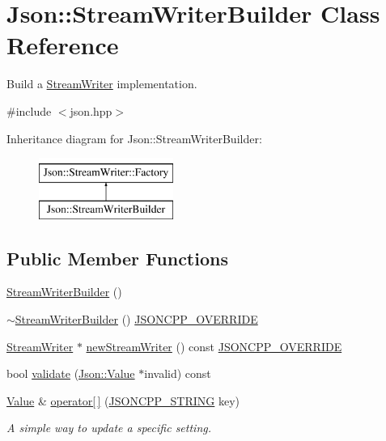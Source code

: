\hypertarget{classJson_1_1StreamWriterBuilder}{}\section{Json\+:\+:Stream\+Writer\+Builder Class Reference}
\label{classJson_1_1StreamWriterBuilder}


Build a \hyperlink{classJson_1_1StreamWriter}{Stream\+Writer} implementation.  




{\ttfamily \#include $<$json.\+hpp$>$}

Inheritance diagram for Json\+:\+:Stream\+Writer\+Builder\+:\begin{figure}[H]
\begin{center}
\leavevmode
\includegraphics[height=2.000000cm]{classJson_1_1StreamWriterBuilder}
\end{center}
\end{figure}
\subsection*{Public Member Functions}
\begin{DoxyCompactItemize}
\item 
\hyperlink{classJson_1_1StreamWriterBuilder_ab95b76179c152673ad14abc639a46ee4}{Stream\+Writer\+Builder} ()
\item 
\hyperlink{classJson_1_1StreamWriterBuilder_a93263f8ef1e2d22593907075d8f0aaef}{$\sim$\+Stream\+Writer\+Builder} () \hyperlink{json_8hpp_a824d6199c91488107e443226fa6022c5}{J\+S\+O\+N\+C\+P\+P\+\_\+\+O\+V\+E\+R\+R\+I\+DE}
\item 
\hyperlink{classJson_1_1StreamWriter}{Stream\+Writer} $\ast$ \hyperlink{classJson_1_1StreamWriterBuilder_ab9ee278609f88ae04a7c1a84e1f559e6}{new\+Stream\+Writer} () const \hyperlink{json_8hpp_a824d6199c91488107e443226fa6022c5}{J\+S\+O\+N\+C\+P\+P\+\_\+\+O\+V\+E\+R\+R\+I\+DE}
\item 
bool \hyperlink{classJson_1_1StreamWriterBuilder_aa1dfed085a3d369e953e4a3c34da009e}{validate} (\hyperlink{classJson_1_1Value}{Json\+::\+Value} $\ast$invalid) const 
\item 
\hyperlink{classJson_1_1Value}{Value} \& \hyperlink{classJson_1_1StreamWriterBuilder_af68f6b59cb20b074052ed12bb3d336a3}{operator\mbox{[}$\,$\mbox{]}} (\hyperlink{json_8hpp_a1e723f95759de062585bc4a8fd3fa4be}{J\+S\+O\+N\+C\+P\+P\+\_\+\+S\+T\+R\+I\+NG} key)
\begin{DoxyCompactList}\small\item\em A simple way to update a specific setting. \end{DoxyCompactList}\end{DoxyCompactItemize}
